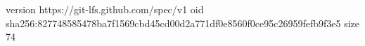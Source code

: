 version https://git-lfs.github.com/spec/v1
oid sha256:827748585478ba7f1569cbd45cd00d2a771df0e8560f0ce95c26959fefb9f3e5
size 74
